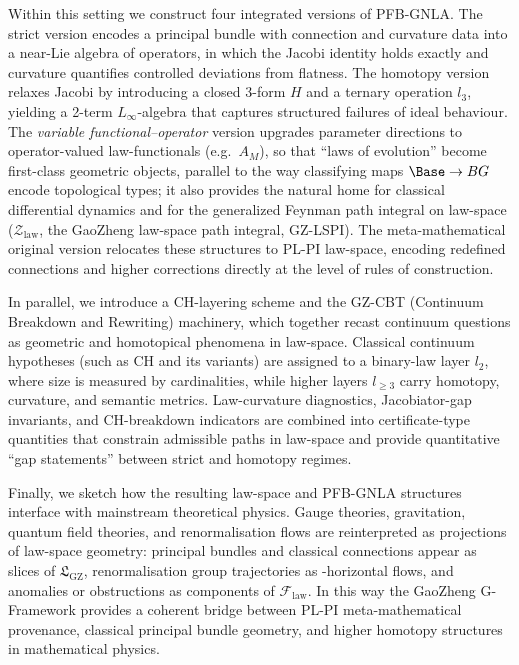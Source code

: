\documentclass[11pt]{book}
\theoremstyle{plain}
\theoremstyle{definition}
\newcommand{\GZLS}{\ensuremath{\mathfrak{L}_{\mathrm{GZ}}}}       \newcommand{\GZLT}{\ensuremath{M_{!w}}}                           \newcommand{\GZLOC}{\ensuremath{A_M}}                             \newcommand{\GZLCurv}{\ensuremath{\mathcal{F}_{\mathrm{law}}}}
\begin{document}
Within this setting we construct four integrated versions of PFB-GNLA.
The strict version encodes a principal bundle with connection and
curvature data into a near-Lie algebra of operators, in which the
Jacobi identity holds exactly and curvature quantifies controlled
deviations from flatness. The homotopy version relaxes Jacobi by
introducing a closed 3-form $H$ and a ternary operation $l_3$, yielding
a 2-term $L_\infty$-algebra that captures structured failures of ideal
behaviour. The \emph{variable functional--operator} version upgrades
parameter directions to operator-valued law-functionals
(e.g.\ $A_M$), so that “laws of evolution” become first-class
geometric objects, parallel to the way classifying maps
$\Base\to BG$ encode topological types; it also provides the
natural home for classical differential dynamics and for the
generalized Feynman path integral on law-space
($\mathcal{Z}_{\mathrm{law}}$, the GaoZheng law-space path
integral, GZ-LSPI). The meta-mathematical original version relocates
these structures to PL-PI law-space,
encoding redefined connections and higher corrections directly at the
level of rules of construction.



In parallel, we introduce a CH-layering scheme and the GZ-CBT
(Continuum Breakdown and Rewriting) machinery, which together recast
continuum questions as geometric and homotopical phenomena in law-space.
Classical continuum hypotheses (such as CH and its variants) are
assigned to a binary-law layer $l_2$, where size is measured by
cardinalities, while higher layers $l_{\ge3}$ carry homotopy, curvature,
and semantic metrics. Law-curvature diagnostics, Jacobiator-gap
invariants, and CH-breakdown indicators are combined into
certificate-type quantities that constrain admissible paths in
law-space and provide quantitative “gap statements” between strict and
homotopy regimes.



Finally, we sketch how the resulting law-space and PFB-GNLA structures
interface with mainstream theoretical physics. Gauge theories,
gravitation, quantum field theories, and renormalisation flows are
reinterpreted as projections of law-space geometry: principal bundles
and classical connections appear as slices of \GZLS, renormalisation
group trajectories as \GZTLC-horizontal flows, and anomalies or
obstructions as components of \GZLCurv. In this way the
GaoZheng G-Framework provides a coherent bridge between PL-PI
meta-mathematical provenance, classical principal bundle geometry,
and higher homotopy structures in mathematical physics.
\end{document}
